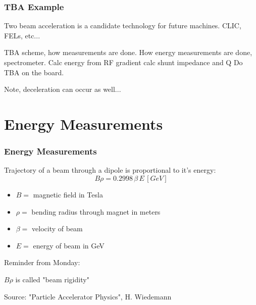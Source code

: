 \documentclass[professionalfonts,t]{beamer}
\begin{document}
\begin{frame}
	\frametitle{TBA Example}

	
	Two beam acceleration is a candidate technology for future machines.
	CLIC, FELs, etc...
	
	TBA scheme, how measurements are done. 
How energy measurements are done, spectrometer.
Calc energy from RF gradient
calc shunt impedance and Q
Do TBA on the board.	

	Note, deceleration can occur as well...
	
\end{frame}



\section{Energy Measurements}
\begin{frame}
	\frametitle{Energy Measurements}
	Trajectory of a beam through a dipole is proportional to it's energy:
	\begin{equation}
		B \rho = 0.2998 \, \beta \, E \, [GeV]
	\end{equation}
	\begin{itemize}
		\item $B = $ magnetic field in Tesla
		\item $\rho =$ bending radius through magnet in meters
		\item $\beta =$ velocity of beam
		\item $E = $ energy of beam in GeV 
	\end{itemize}

\vspace{1em}
Reminder from Monday:

$B\rho$ is called "beam rigidity"

\vspace{1em}
Source: "Particle Accelerator Physics", H. Wiedemann
\end{frame}
\end{document}

